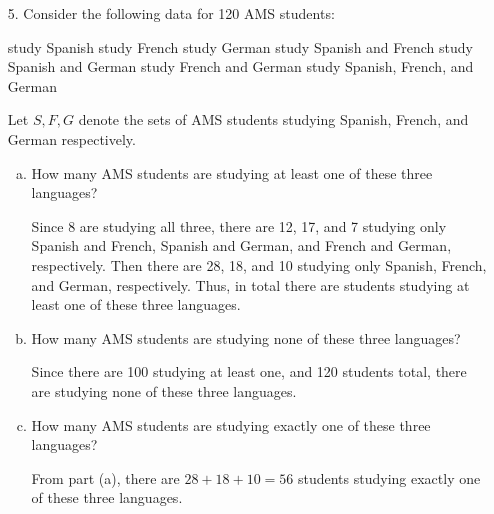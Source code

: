 \documentclass{article}
\begin{document}
\begin{itemize}
\begin{enumerate}[(a)]
			\item $A\cup B= B.$
				\begin{proof}
					Consider $x\in B.$ Then trivially it must be contained in $A\cup B,$ so $B\subset A\cup B.$ For the reverse inclusion, consider $y\in A\cup B,$ which means either $y\in A$ or $y\in B.$ Since $A\subset B,$ it follows that either $y\in B,$ so $A\cup B\subset B,$ so $A\cup B=B,$ as desired.
				\end{proof}
				
		\end{enumerate}

		\newpage
	\item[5.] Consider the following data for 120 AMS students:
		\begin{itemize}
			 study Spanish
			 study French
			 study German
			 study Spanish and French
			 study Spanish and German
			 study French and German
			 study Spanish, French, and German
		\end{itemize}
		Let $S, F, G$ denote the sets of AMS students studying Spanish, French, and German respectively.
		\begin{enumerate}[(a)]
			\item How many AMS students are studying at least one of these three languages?
				\begin{soln}
					Since 8 are studying all three, there are 12, 17, and 7 studying only Spanish and French, Spanish and German, and French and German, respectively. Then there are 28, 18, and 10 studying only Spanish, French, and German, respectively. Thus, in total there are  students studying at least one of these three languages.
				\end{soln}

			\item How many AMS students are studying none of these three languages?
				\begin{soln}
					Since there are 100 studying at least one, and 120 students total, there are  studying none of these three languages.
				\end{soln}

			\item How many AMS students are studying exactly one of these three languages?
				\begin{soln}
					From part (a), there are $28+18+10=\boxed{56}$ students studying exactly one of these three languages.
				\end{soln}


\end{enumerate}
\end{itemize}
\end{document}
